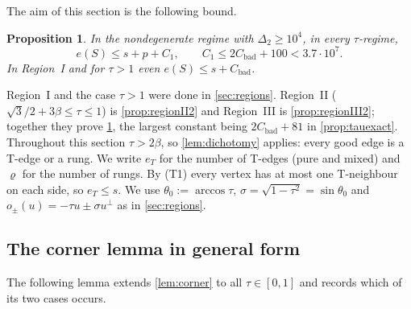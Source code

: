 \documentclass[11pt]{amsart}
\newtheorem{proposition}[theorem]{Proposition}
\theoremstyle{definition}
\theoremstyle{remark}
\newcommand{\Dt}{\Delta_2}
\begin{document}
The aim of this section is the following bound.

\begin{proposition}\label{prop:eS}
In the nondegenerate regime with $\Dt\ge10^4$, in every $\tau$-regime,
\[
e(S)\le s+p+C_1,\qquad C_1\le 2C_{\mathrm{bad}}+100<3.7\cdot10^7 .
\]
In Region~I and for $\tau>1$ even $e(S)\le s+C_{\mathrm{bad}}$.
\end{proposition}

Region~I and the case $\tau>1$ were done in \cref{sec:regions}. Region~II ($\sqrt3/2+3\beta\le\tau\le1$) is \cref{prop:regionII2} and Region~III is \cref{prop:regionIII2}; together they prove \cref{prop:eS}, the largest constant being $2C_{\mathrm{bad}}+81$ in \cref{prop:tauexact}. Throughout this section $\tau>2\beta$, so \cref{lem:dichotomy} applies: every good edge is a T-edge or a rung. We write $e_T$ for the number of T-edges (pure and mixed) and $\varrho$ for the number of rungs. By (T1) every vertex has at most one T-neighbour on each side, so $e_T\le s$. We use $\theta_0:=\arccos\tau$, $\sigma=\sqrt{1-\tau^2}=\sin\theta_0$ and $o_\pm(u)=-\tau u\pm\sigma u^\perp$ as in \cref{sec:regions}.

\subsection{The corner lemma in general form}
The following lemma extends \cref{lem:corner} to all $\tau\in[0,1]$ and records which of its two cases occurs.
\end{document}
